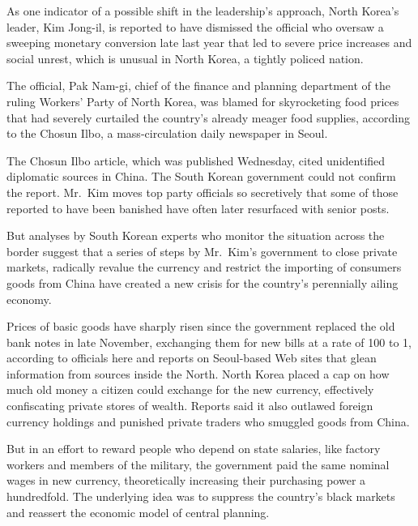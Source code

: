 ﻿\documentclass[12pt]{article}
\begin{document}

As one indicator of a possible shift in the leadership's approach, North Korea's leader, Kim
Jong-il, is reported to have dismissed the official who oversaw a sweeping monetary conversion late
last year that led to severe price increases and social unrest, which is unusual in North Korea, a
tightly policed nation.

The official, Pak Nam-gi, chief of the finance and planning department of the ruling Workers' Party
of North Korea, was blamed for skyrocketing food prices that had severely curtailed the country's
already meager food supplies, according to the Chosun Ilbo, a mass-circulation daily newspaper in
Seoul.

The Chosun Ilbo article, which was published Wednesday, cited unidentified diplomatic sources in
China. The South Korean government could not confirm the report. Mr.~Kim moves top party officials
so secretively that some of those reported to have been banished have often later resurfaced with
senior posts.

But analyses by South Korean experts who monitor the situation across the border suggest that a
series of steps by Mr.~Kim's government to close private markets, radically revalue the currency and
restrict the importing of consumers goods from China have created a new crisis for the country's
perennially ailing economy.

Prices of basic goods have sharply risen since the government replaced the old bank notes in late
November, exchanging them for new bills at a rate of 100 to 1, according to officials here and
reports on Seoul-based Web sites that glean information from sources inside the North. North Korea
placed a cap on how much old money a citizen could exchange for the new currency, effectively
confiscating private stores of wealth. Reports said it also outlawed foreign currency holdings and
punished private traders who smuggled goods from China.

But in an effort to reward people who depend on state salaries, like factory workers and members of
the military, the government paid the same nominal wages in new currency, theoretically increasing
their purchasing power a hundredfold. The underlying idea was to suppress the country's black
markets and reassert the economic model of central planning.
\end{document}
